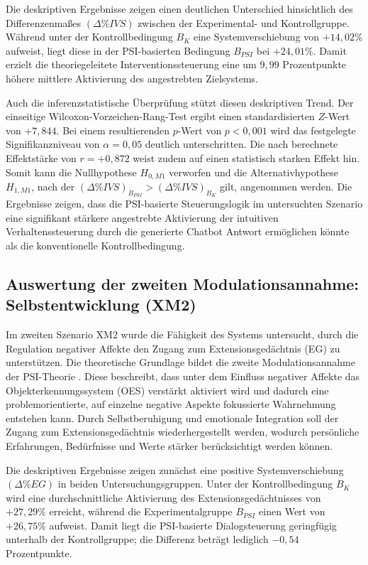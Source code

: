 Die deskriptiven Ergebnisse zeigen einen deutlichen Unterschied hinsichtlich des Differenzenmaßes $(\Delta\%IVS)$ zwischen der Experimental- und Kontrollgruppe. Während unter der Kontrollbedingung $B_{K}$ eine Systemverschiebung von $+14,02\%$ aufweist, liegt diese in der PSI-basierten Bedingung $B_{PSI}$ bei $+24,01\%$. Damit erzielt die theoriegeleitete Interventionssteuerung eine um $9,99$ Prozentpunkte höhere mittlere Aktivierung des angestrebten Zielsystems.

Auch die inferenzstatistische Überprüfung stützt diesen deskriptiven Trend. Der einseitige Wilcoxon-Vorzeichen-Rang-Test ergibt einen standardisierten $Z$-Wert von $+7,844$. Bei einem resultierenden $p$-Wert von $p < 0,001$ wird das festgelegte Signifikanzniveau von $\alpha = 0{,}05$ deutlich unterschritten. Die nach \cite{cohen1988statistical} berechnete Effektstärke von $r = +0,872$ weist zudem auf einen statistisch starken Effekt hin. Somit kann die Nullhypothese $H_{0, M1}$ verworfen und die Alternativhypothese $H_{1, M1}$, nach der $(\Delta\%IVS)_{B_{PSI}} > (\Delta\%IVS)_{B_{K}}$ gilt, angenommen werden. Die Ergebnisse zeigen, dass die PSI-basierte Steuerungslogik im untersuchten Szenario eine signifikant stärkere angestrebte Aktivierung der intuitiven Verhaltenssteuerung durch die generierte Chatbot Antwort ermöglichen könnte als die konventionelle Kontrollbedingung.


\subsection{Auswertung der zweiten Modulationsannahme: Selbstentwicklung (XM2)}
Im zweiten Szenario XM2 wurde die Fähigkeit des Systems untersucht, durch die Regulation negativer Affekte den Zugang zum Extensionsgedächtnis (EG) zu unterstützen. Die theoretische Grundlage bildet die zweite Modulationsannahme der PSI-Theorie \citep{Kuhl2000The,kuhl2014psi}. Diese beschreibt, dass unter dem Einfluss negativer Affekte das Objekterkennungssystem (OES) verstärkt aktiviert wird und dadurch eine problemorientierte, auf einzelne negative Aspekte fokussierte Wahrnehmung entstehen kann. Durch Selbstberuhigung und emotionale Integration soll der Zugang zum Extensionsgedächtnis wiederhergestellt werden, wodurch persönliche Erfahrungen, Bedürfnisse und Werte stärker berücksichtigt werden können.

Die deskriptiven Ergebnisse zeigen zunächst eine positive Systemverschiebung $(\Delta\%EG)$ in beiden Untersuchungsgruppen. Unter der Kontrollbedingung $B_{K}$ wird eine durchschnittliche Aktivierung des Extensionsgedächtnisses von $+27,29\%$ erreicht, während die Experimentalgruppe $B_{PSI}$ einen Wert von $+26,75\%$ aufweist. Damit liegt die PSI-basierte Dialogsteuerung geringfügig unterhalb der Kontrollgruppe; die Differenz beträgt lediglich $-0,54$ Prozentpunkte.

